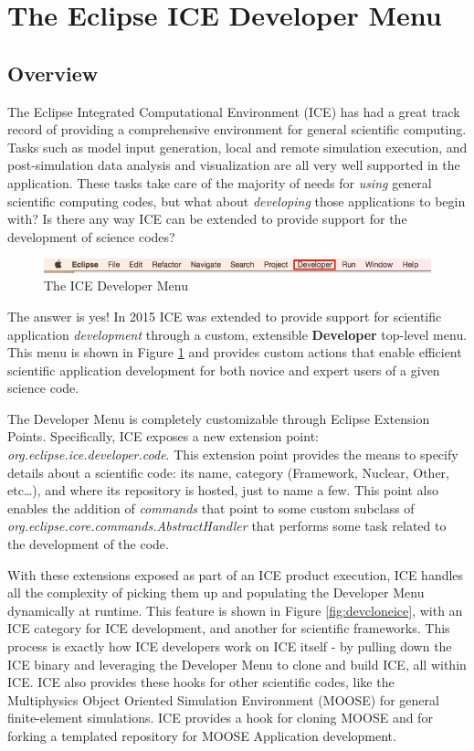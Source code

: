 \section*{The Eclipse ICE Developer Menu}

\subsection*{Overview}
The Eclipse Integrated Computational Environment (ICE) has had a great track
record of providing a comprehensive environment for general scientific
computing. Tasks such as model input generation, local and remote simulation
execution, and post-simulation data analysis and visualization are all very well
supported in the application. These tasks take care of the majority of needs
for \emph{using} general scientific computing codes, but what about
\emph{developing} those applications to begin with? Is there any way ICE can be
extended to provide support for the development of science codes?

\begin{figure}[h]
\includegraphics[width=\textwidth]{figures/icemenu.png}
\centering
\caption{The ICE Developer Menu}
\label{fig:devmenu}
\end{figure}

The answer is yes! In 2015 ICE was extended to provide support for scientific
application \emph{development} through a custom, extensible \textbf{Developer} 
top-level menu. This menu is shown in Figure
\ref{fig:devmenu} and provides custom actions that enable efficient scientific
application development for both novice and expert users of a given science
code.

The Developer Menu is completely customizable through Eclipse Extension Points.
Specifically, ICE exposes a new extension point:
\emph{org.eclipse.ice.developer.code}. This extension point provides the means
to specify details about a scientific code: its name, category (Framework,
Nuclear, Other, etc\ldots), and where its repository is hosted, just to name a
few. This point also enables the addition of \emph{commands} that point to some
custom subclass of \emph{org.eclipse.core.commands.AbstractHandler} that
performs some task related to the development of the code.

With these extensions exposed as part of an ICE product execution, ICE
handles all the complexity of picking them up and populating the Developer Menu
dynamically at runtime. This feature is shown in Figure \ref{fig:devcloneice},
with an ICE category for ICE development, and another for scientific frameworks.
This process is exactly how ICE developers work on ICE itself - by pulling down
the ICE binary and leveraging the Developer Menu to clone and build ICE, all
within ICE. ICE also provides these hooks for other scientific codes, like the
Multiphysics Object Oriented Simulation Environment (MOOSE) for general
finite-element simulations. ICE provides a hook for cloning MOOSE and for
forking a templated repository for MOOSE Application development.

